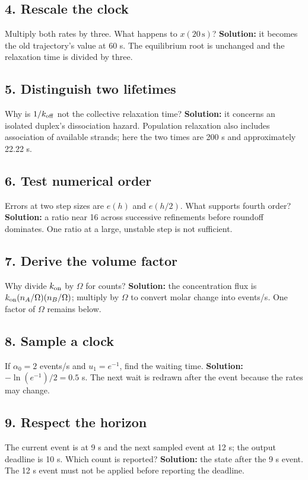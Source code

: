 \subsection*{4. Rescale the clock}
Multiply both rates by three. What happens to $x(20\,\mathrm{s})$?
\textbf{Solution:} it becomes the old trajectory's value at 60 s.
The equilibrium root is unchanged and the relaxation time is divided by three.

\subsection*{5. Distinguish two lifetimes}
Why is $1/k_{\rm off}$ not the collective relaxation time?
\textbf{Solution:} it concerns an isolated duplex's dissociation hazard.
Population relaxation also includes association of available strands;
here the two times are 200 s and approximately 22.22 s.

\subsection*{6. Test numerical order}
Errors at two step sizes are $e(h)$ and $e(h/2)$. What supports fourth order?
\textbf{Solution:} a ratio near 16 across successive refinements before
roundoff dominates. One ratio at a large, unstable step is not sufficient.

\subsection*{7. Derive the volume factor}
Why divide $k_{\rm on}$ by $\Omega$ for counts?
\textbf{Solution:} the concentration flux is
$k_{\rm on}(n_A/\Omega)(n_B/\Omega)$; multiply by $\Omega$
to convert molar change into events/s. One factor of $\Omega$ remains below.

\subsection*{8. Sample a clock}
If $\alpha_0=2$ events/s and $u_1=e^{-1}$, find the waiting time.
\textbf{Solution:} $-\ln(e^{-1})/2=0.5$ s.
The next wait is redrawn after the event because the rates may change.

\subsection*{9. Respect the horizon}
The current event is at 9 s and the next sampled event at 12 s;
the output deadline is 10 s. Which count is reported?
\textbf{Solution:} the state after the 9 s event. The 12 s event must
not be applied before reporting the deadline.

